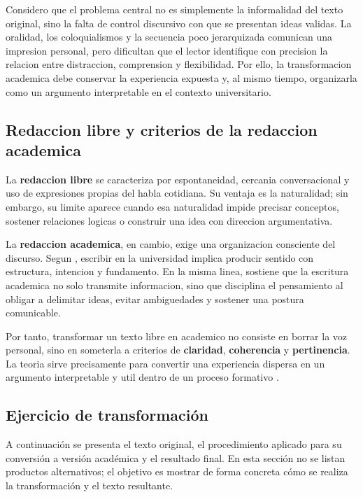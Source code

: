 \documentclass[
	spanish,
	letterpaper, oneside
]{article}
\begin{document}
Considero que el problema central no es simplemente la informalidad del texto original, sino la falta de control discursivo con que se presentan ideas validas. La oralidad, los coloquialismos y la secuencia poco jerarquizada comunican una impresion personal, pero dificultan que el lector identifique con precision la relacion entre distraccion, comprension y flexibilidad. Por ello, la transformacion academica debe conservar la experiencia expuesta y, al mismo tiempo, organizarla como un argumento interpretable en el contexto universitario.

\subsection{Redaccion libre y criterios de la redaccion academica}

La \textbf{redaccion libre} se caracteriza por espontaneidad, cercania conversacional y uso de expresiones propias del habla cotidiana. Su ventaja es la naturalidad; sin embargo, su limite aparece cuando esa naturalidad impide precisar conceptos, sostener relaciones logicas o construir una idea con direccion argumentativa.

La \textbf{redaccion academica}, en cambio, exige una organizacion consciente del discurso. Segun \citet{nunezcortesEscrituraAcademicaTeoria2015}, escribir en la universidad implica producir sentido con estructura, intencion y fundamento. En la misma linea, \citet{vitoriaEscrituraAcademicaFormacion2019} sostiene que la escritura academica no solo transmite informacion, sino que disciplina el pensamiento al obligar a delimitar ideas, evitar ambiguedades y sostener una postura comunicable.

Por tanto, transformar un texto libre en academico no consiste en borrar la voz personal, sino en someterla a criterios de \textbf{claridad}, \textbf{coherencia} y \textbf{pertinencia}. La teoria sirve precisamente para convertir una experiencia dispersa en un argumento interpretable y util dentro de un proceso formativo \citep{correaManualBasicoEscritura2018}.

\subsection{Ejercicio de transformaci\'on}

A continuaci\'on se presenta el texto original, el procedimiento aplicado para su conversi\'on a versi\'on acad\'emica y el resultado final. En esta secci\'on no se listan productos alternativos; el objetivo es mostrar de forma concreta c\'omo se realiza la transformaci\'on y el texto resultante.
\end{document}
